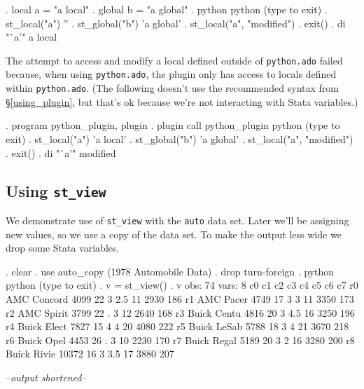 \documentclass{article}
\begin{document}
\begin{stlog}
. local a = "a local"
{\smallskip}
. global b = "a global"
{\smallskip}
. python
 python (type {} to exit) 
. st_local("a")
''
{\smallskip}
. st_global("b")
'a global'
{\smallskip}
. st_local("a", "modified")
{\smallskip}
. exit()
{\smallskip}
. di "`a'"
a local
\end{stlog}

\medskip

The attempt to access and modify a local defined outside of \lstinline$python.ado$ failed because, when using \lstinline$python.ado$, the plugin only has access to locals defined within \lstinline$python.ado$. (The following doesn't use the recommended syntax from \S\ref{using_plugin}, but that's ok because we're not interacting with Stata variables.)

\begin{stlog}
. program python_plugin, plugin
{\smallskip}
. plugin call python_plugin
 python (type {} to exit) 
. st_local("a")
'a local'
{\smallskip}
. st_global("b")
'a global'
{\smallskip}
. st_local("a", "modified")
{\smallskip}
. exit()
{\smallskip}
. di "`a'"
modified
\end{stlog}

\smallskip



\subsection{Using \lstinline{st_view}} \label{st_view_example}

We demonstrate use of \lstinline{st_view} with the \lstinline{auto} data set. Later we'll be assigning new values, so we use a copy of the data set. To make the output less wide we drop some Stata variables.

\begin{stlog}
. clear
{\smallskip}
. use auto_copy
(1978 Automobile Data)
{\smallskip}
. drop turn-foreign
{\smallskip}
. python
 python (type {} to exit) 
. v = st_view()
{\smallskip}
. v
{\smallskip}
  obs: 74
 vars:  8
{\smallskip}
             c0       c1       c2       c3       c4       c5       c6       c7
 r0 AMC Concord     4099       22        3      2.5       11     2930      186
 r1   AMC Pacer     4749       17        3        3       11     3350      173
 r2  AMC Spirit     3799       22        .        3       12     2640      168
 r3 Buick Centu     4816       20        3      4.5       16     3250      196
 r4 Buick Elect     7827       15        4        4       20     4080      222
 r5 Buick LeSab     5788       18        3        4       21     3670      218
 r6  Buick Opel     4453       26        .        3       10     2230      170
 r7 Buick Regal     5189       20        3        2       16     3280      200
 r8 Buick Rivie    10372       16        3      3.5       17     3880      207

--\textit{output shortened}--
\end{stlog}
\end{document}
